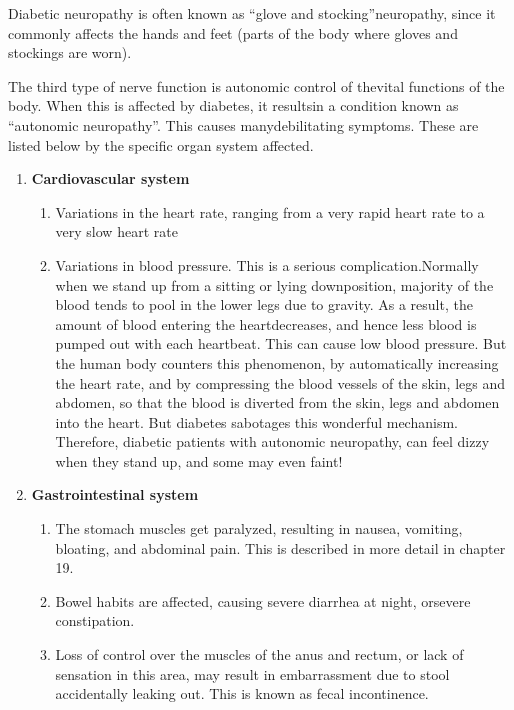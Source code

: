 Diabetic neuropathy is often known as “glove and stocking”\break neuropathy, since it commonly affects the hands and feet (parts of the body where gloves and stockings are worn).

The third type of nerve function is autonomic control of the\break vital functions of the body. When this is affected by diabetes, it results\break in a condition known as “autonomic neuropathy”. This causes many\break debilitating symptoms. These are listed below by the specific organ system affected.

\vspace{-\topsep}
\begin{enumerate}[•]
\itemsep=0pt
\item \textbf{Cardiovascular system}
\vspace{-\topsep}
\begin{enumerate}[o]
\itemsep=0pt
\item Variations in the heart rate, ranging from a very rapid heart rate to a very slow heart rate
\item Variations in blood pressure. This is a serious complication.\break Normally when we stand up from a sitting or lying down\break position, majority of the blood tends to pool in the lower legs due to gra\-vity. As a result, the amount of blood entering the heart\break decreases, and hence less blood is pumped out with each heartbeat. This can cause low blood pressure. But the human body counters this pheno\-menon, by automatically increasing the heart rate, and by compressing the blood vessels of the skin, legs and abdomen, so that the blood is diverted from the skin, legs and abdomen into the heart. But diabetes sabotages this wonderful mechanism. Therefore, diabetic patients with autonomic neuro\-pathy, can feel dizzy when they stand up, and some may even faint!
\end{enumerate}
\item \textbf{Gastrointestinal system}
\vspace{-\topsep}
\begin{enumerate}[o]
\itemsep=0pt
\item The stomach muscles get paralyzed, resulting in nausea, vomiting, bloating, and abdominal pain. This is described in more detail in chapter 19.
\item Bowel habits are affected, causing severe diarrhea at night, or\break severe constipation.
\item Loss of control over the muscles of the anus and rectum, or lack of sensation in this area, may result in embarrassment due to stool accidentally leaking out. This is known as fecal incontinence.

\end{enumerate}
\end{enumerate}
